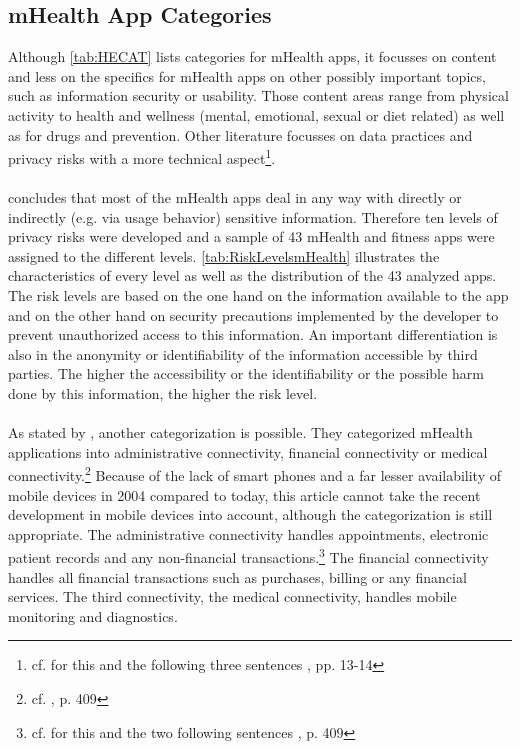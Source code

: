 \subsection{mHealth App Categories}
Although \ref{tab:HECAT} lists categories for mHealth apps, it focusses on content and less on the specifics for mHealth apps on other possibly important topics, such as information security or usability. Those content areas range from physical activity to health and wellness (mental, emotional, sexual or diet related) as well as for drugs and prevention. Other literature focusses on data practices and privacy risks with a more technical aspect\footnote{cf. for this and the following three sentences \cite{Njie.2013}, pp. 13-14}. 
\\
\\
\cite{Njie.2013} concludes that most of the mHealth apps deal in any way with directly or indirectly (e.g. via usage behavior) sensitive information. Therefore ten levels of privacy risks were developed and a sample of 43 mHealth and fitness apps were assigned to the different levels. \ref{tab:RiskLevelsmHealth} illustrates the characteristics of every level as well as the distribution of the 43 analyzed apps. 
\\
The risk levels are based on the one hand on the information available to the app and on the other hand on security precautions implemented by the developer to prevent unauthorized access to this information. An important differentiation is also in the anonymity or identifiability of the information accessible by third parties. The higher the accessibility or the identifiability or the possible harm done by this information, the higher the risk level.
\\
\\
As stated by \cite{Istepanian.2004}, another categorization is possible. They categorized mHealth applications into administrative connectivity, financial connectivity or medical connectivity.\footnote{cf. \cite{Istepanian.2004}, p. 409} Because of the lack of smart phones and a far lesser availability of mobile devices in 2004 compared to today, this article cannot take the recent development in mobile devices into account, although the categorization is still appropriate. The administrative connectivity handles appointments, electronic patient records and any non-financial transactions.\footnote{cf. for this and the two following sentences \cite{Istepanian.2004}, p. 409} The financial connectivity handles all financial transactions such as purchases, billing or any financial services. The third connectivity, the medical connectivity, handles mobile monitoring and diagnostics.
